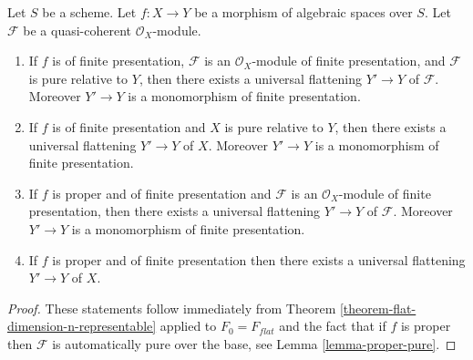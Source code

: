 \begin{lemma}
\label{lemma-when-universal-flattening}
Let $S$ be a scheme.
Let $f : X \to Y$ be a morphism of algebraic spaces over $S$.
Let $\mathcal{F}$ be a quasi-coherent $\mathcal{O}_X$-module.
\begin{enumerate}
\item If $f$ is of finite presentation, $\mathcal{F}$ is an
$\mathcal{O}_X$-module of finite presentation, and $\mathcal{F}$ is
pure relative to $Y$, then there exists a universal flattening
$Y' \to Y$ of $\mathcal{F}$. Moreover $Y' \to Y$ is a monomorphism
of finite presentation.
\item If $f$ is of finite presentation and $X$ is pure relative to $Y$,
then there exists a universal flattening $Y' \to Y$ of $X$.
Moreover $Y' \to Y$ is a monomorphism of finite presentation.
\item If $f$ is proper and of finite presentation and $\mathcal{F}$ is an
$\mathcal{O}_X$-module of finite presentation, then there exists a
universal flattening $Y' \to Y$ of $\mathcal{F}$. Moreover $Y' \to Y$ is
a monomorphism of finite presentation.
\item If $f$ is proper and of finite presentation
then there exists a universal flattening $Y' \to Y$ of $X$.
\end{enumerate}
\end{lemma}

\begin{proof}
These statements follow immediately from
Theorem \ref{theorem-flat-dimension-n-representable}
applied to $F_0 = F_{flat}$
and the fact that if $f$ is proper then $\mathcal{F}$ is automatically
pure over the base, see
Lemma \ref{lemma-proper-pure}.
\end{proof}












